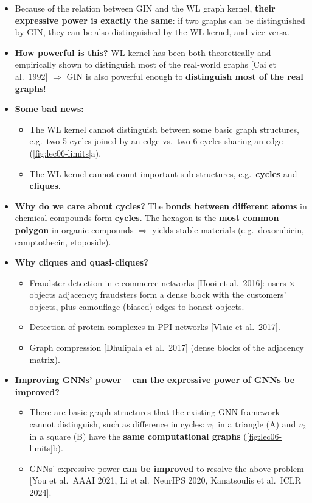 \begin{itemize}
  \item Because of the relation between GIN and the WL graph kernel, \textbf{their
    expressive power is exactly the same}: if two graphs can be distinguished by
    GIN, they can be also distinguished by the WL kernel, and vice versa.
  \item \textbf{How powerful is this?} WL kernel has been both theoretically and
    empirically shown to distinguish most of the real-world graphs [Cai et al.\
    1992] $\Rightarrow$ GIN is also powerful enough to \textbf{distinguish most of
    the real graphs}!
  \item \textbf{Some bad news:}
    \begin{itemize}
      \item The WL kernel cannot distinguish between some basic graph structures,
        e.g.\ two 5-cycles joined by an edge vs.\ two 6-cycles sharing an edge
        (\cref{fig:lec06-limits}a).
      \item The WL kernel cannot count important sub-structures, e.g.\
        \textbf{cycles} and \textbf{cliques}.
    \end{itemize}
  \item \textbf{Why do we care about cycles?} The \textbf{bonds between different
    atoms} in chemical compounds form \textbf{cycles}. The hexagon is the
    \textbf{most common polygon} in organic compounds $\Rightarrow$ yields stable
    materials (e.g.\ doxorubicin, camptothecin, etoposide).
  \item \textbf{Why cliques and quasi-cliques?}
    \begin{itemize}
      \item Fraudster detection in e-commerce networks [Hooi et al.\ 2016]:
        users $\times$ objects adjacency; fraudsters form a dense block with the
        customers' objects, plus camouflage (biased) edges to honest objects.
      \item Detection of protein complexes in PPI networks [Vlaic et al.\ 2017].
      \item Graph compression [Dhulipala et al.\ 2017] (dense blocks of the
        adjacency matrix).
    \end{itemize}
  \item \textbf{Improving GNNs' power -- can the expressive power of GNNs be
    improved?}
    \begin{itemize}
      \item There are basic graph structures that the existing GNN framework cannot
        distinguish, such as difference in cycles: $v_1$ in a triangle (A) and
        $v_2$ in a square (B) have the \textbf{same computational graphs}
        (\cref{fig:lec06-limits}b).
      \item GNNs' expressive power \textbf{can be improved} to resolve the above
        problem [You et al.\ AAAI 2021, Li et al.\ NeurIPS 2020, Kanatsoulis et al.\
        ICLR 2024].
    \end{itemize}
\end{itemize}

